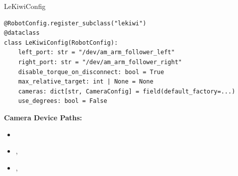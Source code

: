 \begin{frame}[fragile]{LeKiwiConfig}
\begin{lstlisting}[basicstyle=\ttfamily\scriptsize]
@RobotConfig.register_subclass("lekiwi")
@dataclass
class LeKiwiConfig(RobotConfig):
    left_port: str = "/dev/am_arm_follower_left"
    right_port: str = "/dev/am_arm_follower_right"
    disable_torque_on_disconnect: bool = True
    max_relative_target: int | None = None
    cameras: dict[str, CameraConfig] = field(default_factory=...)
    use_degrees: bool = False
\end{lstlisting}

\vspace{0.3cm}

\textbf{Camera Device Paths:}
\begin{itemize}
    \item {}
    \item {}, 
    \item {}, 
\end{itemize}
\end{frame}

